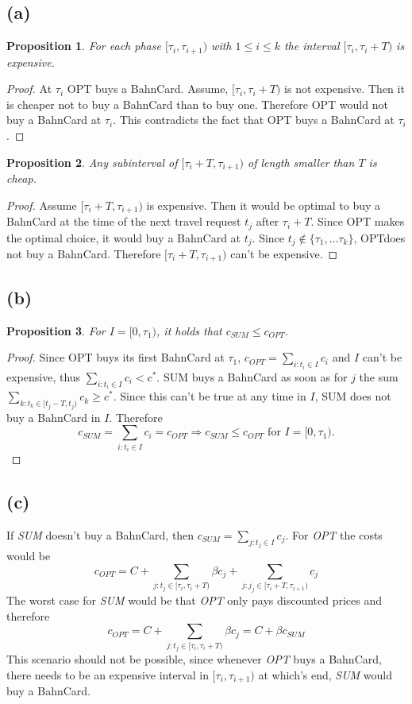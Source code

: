 \documentclass[a4paper,12pt]{scrartcl}
\newcounter{sheet}
\newtheorem{proposition}{Proposition}[sheet]
\begin{document}
\subsection*{(a)}
\begin{proposition} For each phase $[\tau_i,\tau_{i+1})$ with $1 \leq i\leq k$ the interval $[\tau_i,\tau_i+T)$ is expensive. \end{proposition}
\begin{proof}
At $\tau_i$ OPT buys a BahnCard. Assume, $[\tau_i,\tau_i+T)$ is not expensive. Then it is cheaper not to buy a BahnCard than to buy one. Therefore OPT would not buy a BahnCard at $\tau_i$. This contradicts the fact that OPT buys a BahnCard at $\tau_i$.
\end{proof}

\begin{proposition} Any subinterval of $[\tau_i+T,\tau_{i+1})$ of length smaller than $T$ is cheap. \end{proposition}
\begin{proof}
Assume $[\tau_i+T,\tau_{i+1})$ is expensive. Then it would be optimal to buy a BahnCard at the time of the next travel request $t_j$ after $\tau_i+T$. Since OPT makes the optimal choice, it would buy a BahnCard at $t_j$. Since $t_j \notin \{\tau_1, \dots \tau_k\}$, OPTdoes not buy a BahnCard. Therefore $[\tau_i+T,\tau_{i+1})$ can't be expensive.  
\end{proof}

\pagebreak

\subsection*{(b)}
\begin{proposition} For $I=[0,\tau_1)$, it holds that $c_{SUM} \leq c_{OPT}$. \end{proposition}
\begin{proof}
Since OPT buys its first BahnCard at $\tau_1$, $c_{OPT} = \sum_{i: t_i \in I}c_i$ and $I$ can't be expensive, thus $\sum_{i: t_i \in I}c_i < c^*$. SUM buys a BahnCard as soon as for $j$ the sum $\sum_{k:t_k \in [t_j-T,t_j)} c_k \geq c^*$. Since this can't be true at any time in $I$, SUM does not buy a BahnCard in $I$. Therefore
\[c_{SUM} = \sum_{i: t_i \in I}c_i = c_{OPT} \Rightarrow c_{SUM} \leq c_{OPT} \text{ for } I = [0,\tau_1).\]
\end{proof}


\subsection*{(c)}
If \textit{SUM} doesn't buy a BahnCard, then $c_{SUM} = \sum_{j:t_j \in I}c_j$.
For \textit{OPT} the costs would be 
\[c_{OPT} = C + \sum_{j:t_j \in [\tau_i,\tau_i+T)} \beta c_j + \sum_{j:j_j \in [\tau_i+T,\tau_{i+1})}c_j\]
The worst case for \textit{SUM} would be that \textit{OPT} only pays discounted prices and therefore
\[c_{OPT} = C + \sum_{j:t_j \in [\tau_i,\tau_i+T)} \beta c_j = C + \beta c_{SUM}\]
This scenario should not be possible, since whenever \textit{OPT} buys a BahnCard, there needs to be an expensive interval in $[\tau_i,\tau_{i+1})$ at which's end, \textit{SUM} would buy a BahnCard.
\end{document}
